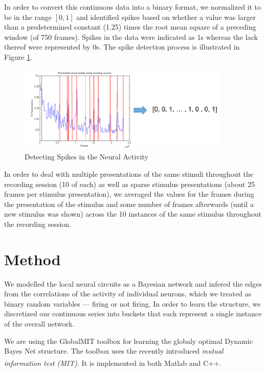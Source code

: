 \documentclass{article}
\begin{document}
In order to convert this continuous data into a binary format, we normalized 
it to be in the range $[0, 1]$ and identified spikes based on whether a value 
was larger than a predetermined constant (1.25) times the root mean square of 
a preceding window (of 750 frames). Spikes in the data were indicated as 1s 
whereas the lack thereof were represented by 0s. The spike detection process 
is illustrated in Figure \ref{fig:spikes}.

\begin{figure}[ht]
  \centering

  \includegraphics[width=0.9\textwidth]{detecting_spikes}
  \caption{Detecting Spikes in the Neural Activity}
  \label{fig:spikes}
\end{figure}

In order to deal with multiple presentations of the same stimuli throughout 
the recording session (10 of each) as well as sparse stimulus presentations 
(about 25 frames per stimulus presentation), we averaged the values for the 
frames during the presentation of the stimulus and some number of frames 
afterwards (until a new stimulus was shown) across the 10 instances of the 
same stimulus throughout the recording session. \par

\section{Method}

We modelled the local neural circuits as a Bayesian network and infered 
the edges from the correlations of the activity of individual neurons, which 
we treated as binary random variables --– firing or not firing. In order to 
learn the structure, we discretized our continuous series into buckets 
that each represent a single instance of the overall network. \par

We are using the GlobalMIT toolbox for learning the globaly optimal Dynamic 
Bayes Net structure.\cite{globalmit} The toolbox uses the recently introduced 
\emph{mutual information test (MIT)}. It is implemented in both 
Matlab\textsuperscript{\textregistered} and C++. \par
\end{document}
